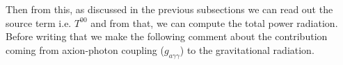 \color{black}
Then from this, as discussed in the previous subsections we can read out the source term i.e. $T^{00}$ and from that, we can compute the total power radiation. Before writing that we make the following comment about the contribution coming from axion-photon coupling ($g_
{a\gamma\gamma}$) to the gravitational radiation.  
\vspace{0.2cm}

